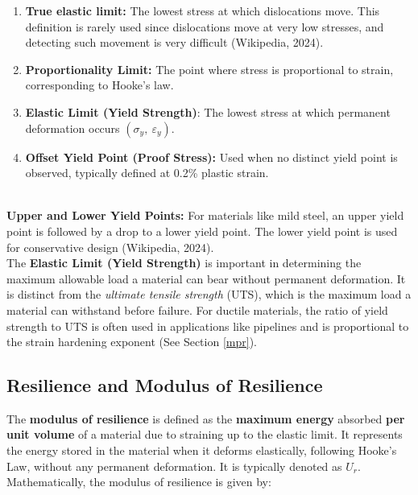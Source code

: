 \documentclass{article}
\begin{document}
{\begin{minipage}{0.4\textwidth}
\begin{figure}[H]
     \label{fig:str}
 \end{figure} 
 \end{minipage}\hfil
\begin{minipage}{0.6\textwidth}
 \begin{enumerate}
     \item \textbf{True elastic limit:} The lowest stress at which dislocations move. This definition is rarely used since dislocations move at very low stresses, and detecting such movement is very difficult (Wikipedia, 2024).
     \item \textbf{Proportionality Limit:} The point where stress is proportional to strain, corresponding to Hooke's law.
     \item \textbf{Elastic Limit (Yield Strength)}: The lowest stress at which permanent deformation occurs \((\sigma_y,\ \varepsilon_y)\).
     \item \textbf{Offset Yield Point (Proof Stress):} Used when no distinct yield point is observed, typically defined at 0.2\% plastic strain.
 \end{enumerate}
  \end{minipage}\\[8pt]
\textbf{Upper and Lower Yield Points:} For materials like mild steel, an upper yield point is followed by a drop to a lower yield point. The lower yield point is used for conservative design (Wikipedia, 2024).\\[8pt]
The \textbf{Elastic Limit (Yield Strength)} is important in determining the maximum allowable load a material can bear without permanent deformation. It is distinct from the \textit{ultimate tensile strength} (UTS), which is the maximum load a material can withstand before failure. For ductile materials, the ratio of yield strength to UTS is often used in applications like pipelines and is proportional to the strain hardening exponent (See Section \ref{mpr}).
    
\newpage    

\subsection{Resilience and Modulus of Resilience}\label{mor}

The \textbf{modulus of resilience} is defined as the \textbf{maximum energy} absorbed \textbf{per unit volume} of a material due to straining up to the elastic limit. It represents the energy stored in the material when it deforms elastically, following Hooke's Law, without any permanent deformation. It is typically denoted as \( U_r \). Mathematically, the modulus of resilience is given by:

}
\end{document}
